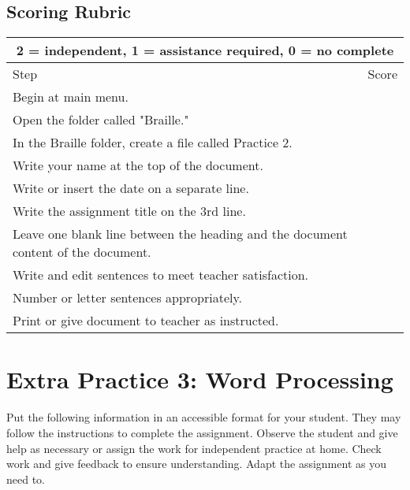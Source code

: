 \documentclass[10pt,letterpaper,twoside]{report}
\begin{document}
{\subsection{Scoring Rubric}
{
\renewcommand{\arraystretch}{1.5}
\begin{table}[!htbp]
	\centering
	\begin{tabular}{|l|r|}
		\hline
		\multicolumn{2}{|c|}{2 = independent, 1 = assistance required, 0 = no complete} \\
		\hline
		Step                                                                               & Score \\[.5em]
		\hline
		Begin at main menu.                                                                &       \\ \hline
		Open the folder called "Braille."                                                  &       \\ \hline	
		In the Braille folder, create a file called Practice 2.                            &       \\ \hline	
		Write your name at the top of the document.                                        &       \\ \hline
		Write or insert the date on a separate line.                                       &       \\ \hline		
		Write the assignment title on the 3rd line.                                        &       \\ \hline	
		Leave one blank line between the heading and the document content of the document. &       \\ \hline
		Write and edit sentences to meet teacher satisfaction.                             &       \\ \hline		
		Number or letter sentences appropriately.                                          &       \\ \hline
		Print or give document to teacher as instructed.                                   &       \\ \hline
	\end{tabular}
	
\end{table}

\clearpage
\section{Extra Practice 3: Word Processing}
Put the following information in an accessible format for your student. They may follow the instructions to complete the assignment. Observe the student and give help as necessary or assign the work for independent practice at home. Check work and give feedback to ensure understanding. Adapt the assignment as you need to.
}}
\end{document}
